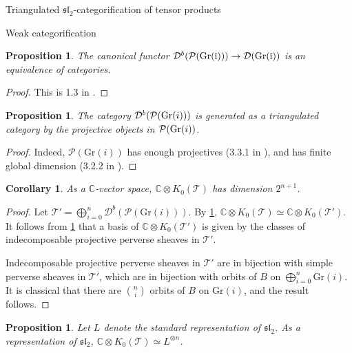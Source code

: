 \documentclass[12pt]{amsart}
\newtheorem{cor}[thm]{Corollary}
\newtheorem{prpn}[thm]{Proposition}
\theoremstyle{definition}
\theoremstyle{remark}
\theoremstyle{remark}
\begin{document}
\begin{section}{Triangulated $\mathfrak{sl}_{2}$-categorification of tensor products}
\begin{subsection}{Weak categorification}
\begin{prpn} \label{TriangEquiv} The canonical functor $\mathcal{D}^{b}(\mathcal{P}(\rm{Gr}(i))) \rightarrow \mathcal{D}({\rm Gr}(i))$ is an equivalence of categories. \end{prpn}

\begin{proof} This is 1.3 in \cite{BeilinsonDerivedCategoryPerverseSheaves}. \end{proof}
  
\begin{prpn} \label{GenProj} The category $\mathcal{D}^{b}(\mathcal{P}({\rm Gr}(i)))$ is generated as a triangulated category by the projective objects in $\mathcal{P}({\rm Gr}(i))$.  \end{prpn}

\begin{proof} Indeed, $\mathcal{P}(\text{Gr}(i))$ has enough projectives (3.3.1 in \cite{BeilinsonGinzburgSoergelKoszulDualityPatternsRepresentationTheory}), and has finite global dimension (3.2.2 in \cite{BeilinsonGinzburgSoergelKoszulDualityPatternsRepresentationTheory}).  \end{proof}

\begin{cor} \label{Dimn} As a $\mathbb{C}$-vector space, $\mathbb{C} \otimes K_{0}(\mathcal{T})$ has dimension $2^{n+1}$. \end{cor}

\begin{proof} Let $\mathcal{T}' = \bigoplus_{i=0}^{n} \mathcal{D}^{b}(\mathcal{P}(\text{Gr}(i)))$. By \ref{TriangEquiv}, $\mathbb{C} \otimes K_{0}(\mathcal{T}) \simeq \mathbb{C} \otimes K_{0}(\mathcal{T}')$. It follows from \ref{GenProj} that a basis of $\mathbb{C} \otimes K_{0}(\mathcal{T}')$ is given by the classes of indecomposable projective perverse sheaves in $\mathcal{T}'$. 

Indecomposable projective perverse sheaves in $\mathcal{T}'$ are in bijection with simple perverse sheaves in $\mathcal{T}'$, which are in bijection with orbits of $B$ on $\bigoplus_{i=0}^{n} \text{Gr}(i)$. It is classical that there are $\binom{n}{i}$ orbits of $B$ on $\text{Gr}(i)$, and the result follows. \end{proof}

\begin{prpn} \label{Iso} Let $L$ denote the standard representation of $\mathfrak{sl}_{2}$. As a representation of $\mathfrak{sl}_{2}$, $\mathbb{C} \otimes K_{0}(\mathcal{T}) \simeq L^{\otimes n}$. \end{prpn}


\end{subsection}
\end{section}
\end{document}
